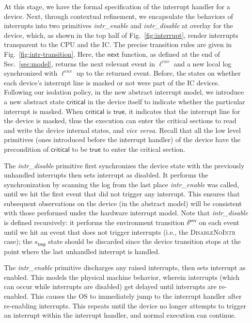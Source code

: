 At this stage, we have the formal specification of the interrupt
handler for a device.  Next, through contextual refinement, we
encapsulate the behaviors of interrupts into two primitives {\it
  intr\_enable} and {\it intr\_disable} at overlay for the device,
which, as shown in the top half of Fig.~\ref{fig:interrupt}, render
interrupts transparent to the CPU and the IC.  The precise
transition rules are given in Fig.~\ref{fig:intr-transition}. 
Here, the $\textsf{next}$
function, as defined at the end of Sec.~\ref{sec:model}, returns the
next relevant event in $\ell^{env}$ and a new local log synchronized
with $\ell^{env}$ up to the returned event. Before,
the states on whether each device's interrupt line is masked or not
were part of the IC devices. Following our isolation policy, in the
new abstract interrupt model, we introduce a new abstract state
$\textsf{critical}$ in the device itself to indicate whether the particular
interrupt is masked. When $\textsf{critical}$ is $\textsf{true}$,
it indicates that the interrupt line for the device is masked, thus
the execution can enter the critical sections to read and write the device
internal states, and {\it vice versa}. Recall that all the low level
primitives (ones introduced before the interrupt handler) of the device
have the precondition of $\textsf{critical}$ to be 
$\textsf{true}$ to enter the critical section.

The {\it intr\_disable} primitive first synchronizes the device state
with the previously unhandled interrupts then sets interrupt as
disabled.  It performs the synchronization by scanning the log from
the last place {\it intr\_enable} was called, until we hit the first
event that did not trigger any interrupt.  This ensures that
subsequent observations on the device (in the abstract model) will be
consistent with those performed under the hardware interrupt model.
Note that {\it intr\_disable} is defined recursively: it performs the
environment transition $\delta^{\textsf{env}}$ on each event until we
hit an event that does not trigger interrupts (i.e., the
\textsc{DisableNoIntr} case); the $s_{\textsf{tmp}}$ state should be 
discarded since the device
transition stops at the point where the last unhandled interrupt is
handled.

The {\it intr\_enable} primitive discharges any raised interrupts,
then sets interrupt as enabled. This models the physical machine
behavior, wherein interrupts (which can occur while interrupts are
disabled) get delayed until interrupts are re-enabled. This causes the
OS to immediately jump to the interrupt handler after re-enabling
interrupts. This repeats until the device no longer attempts to
trigger an interrupt within the interrupt handler, and normal
execution can continue.

